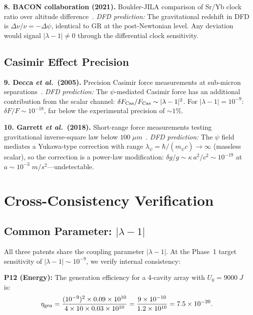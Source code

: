 \documentclass[twocolumn,superscriptaddress,prd]{revtex4-2}
\newcommand{\etal}{\textit{et al.}}
\begin{document}
\textbf{8. BACON collaboration (2021).} Boulder-JILA comparison of
Sr/Yb clock ratio over altitude difference~\cite{BACON2021}.
\textit{DFD prediction:} The gravitational redshift in DFD is
$\Delta\nu/\nu = -\Delta\psi$, identical to GR at the
post-Newtonian level.  Any deviation would signal $|\lambda-1|
\neq 0$ through the differential clock sensitivity.

\subsection{Casimir Effect Precision}

\textbf{9. Decca \etal\ (2005).} Precision Casimir force
measurements at sub-micron separations~\cite{Decca2005}.
\textit{DFD prediction:} The $\psi$-mediated Casimir force
has an additional contribution from the scalar channel:
$\delta F_{\rm Cas}/F_{\rm Cas} \sim |\lambda-1|^2$.  For
$|\lambda-1| = 10^{-9}$: $\delta F/F \sim 10^{-18}$, far
below the experimental precision of $\sim 1\%$.

\textbf{10. Garrett \etal\ (2018).} Short-range force
measurements testing gravitational inverse-square law below
$100\;\si{\mu m}$~\cite{Garrett2018}.  \textit{DFD prediction:}
The $\psi$ field mediates a Yukawa-type correction with range
$\lambda_\psi = \hbar/(m_\psi c) \to \infty$ (massless scalar),
so the correction is a power-law modification:
$\delta g/g \sim \kappa\,a^2/c^2 \sim 10^{-19}$ at
$a \sim 10^{-3}\;\si{m/s^2}$---undetectable.

\section{Cross-Consistency Verification}
\label{sec:consistency}

\subsection{Common Parameter: $|\lambda-1|$}

All three patents share the coupling parameter $|\lambda-1|$.
At the Phase~1 target sensitivity of $|\lambda-1| \sim 10^{-9}$,
we verify internal consistency:

\textbf{P12 (Energy):} The generation efficiency for a 4-cavity
array with $U_0 = 9000\;\si{J}$ is:
\begin{equation}
\eta_{\rm gen} = \frac{(10^{-9})^2 \times 0.09 \times 10^{10}}{4 \times 10 \times 0.03 \times 10^{10}} = \frac{9\times10^{-10}}{1.2\times10^{10}} = 7.5\times10^{-20}.
\end{equation}
\end{document}
